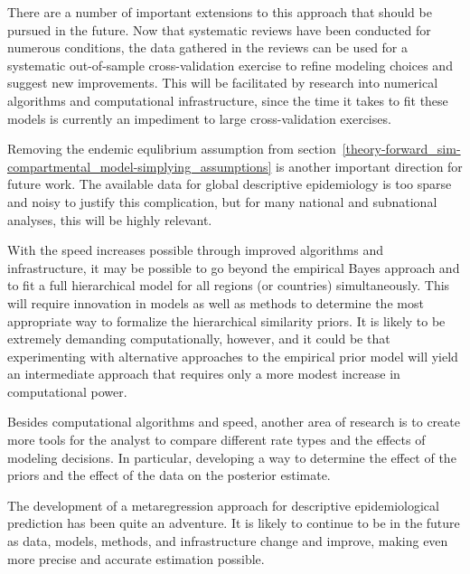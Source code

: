 There are a number of important extensions to this approach that
should be pursued in the future.  Now that systematic reviews have
been conducted for numerous conditions, the data gathered in the
reviews can be used for a systematic out-of-sample cross-validation
exercise to refine modeling choices and suggest new improvements.
This will be facilitated by research into numerical algorithms and
computational infrastructure, since the time it takes to fit these
models is currently an impediment to large cross-validation exercises.

Removing the endemic equlibrium assumption from
section~\ref{theory-forward_sim-compartmental_model-simplying_assumptions}
is another important direction for future work.  The available data
for global descriptive epidemiology is too sparse and noisy to justify
this complication, but for many national and subnational analyses,
this will be highly relevant.

With the speed increases possible through improved algorithms and
infrastructure, it may be possible to go beyond the empirical Bayes
approach and to fit a full hierarchical model for all regions (or
countries) simultaneously.  This will require innovation in models as
well as methods to determine the most appropriate way to formalize the
hierarchical similarity priors.  It is likely to be extremely
demanding computationally, however, and it could be that experimenting
with alternative approaches to the empirical prior model will yield an
intermediate approach that requires only a more modest increase in
computational power.




Besides computational algorithms and speed, another area of research 
is to create more tools for the analyst to
compare different rate types and the effects of modeling decisions.
In particular, developing a way to determine the effect of the priors 
and the effect of the data on the posterior estimate.

The development of a metaregression approach for descriptive
epidemiological prediction has been quite an adventure.  It is likely
to continue to be in the future as data, models, methods, and
infrastructure change and improve, making even more precise and
accurate estimation possible.